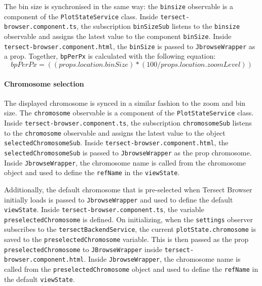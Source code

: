 \documentclass[12pt]{article}
\begin{document}
\begin{itemize}
The bin size is synchronised in the same way: the \verb +binsize+ observable is a component of the \verb +PlotStateService+ class. Inside \verb +tersect-browser.component.ts+, the subscription \verb +binSizeSub+ listens to the \verb +binsize+ observable and assigns the latest value to the component \verb +binSize+. Inside \verb +tersect-browser.component.html+, the \verb +binSize+ is passed to \verb +JbrowseWrapper+ as a prop. 
Together, \verb +bpPerPx+ is calculated with the following equation: \begin{equation} bpPerPx = ((props.location.binSize) * (100 /props.location.zoomLevel)) \end{equation}


\paragraph{Chromosome selection}
The displayed chromosome is synced in a similar fashion to the zoom and bin size. The \verb +chromosome+ observable is a component of the \verb +PlotStateService+ class. Inside \verb +tersect-browser.component.ts+, the subscription \verb +chromosomeSub+ listens to the \verb +chromosome+ observable and assigns the latest value to the object \verb +selectedChromosomeSub+. Inside \verb +tersect-browser.component.html+, the \verb +selectedChromosomeSub+ is passed to \verb +JbrowseWrapper+ as the prop chromosome. Inside \verb +JbrowseWrapper+, the chromosome name is called from the chromosome object and used to define the \verb +refName+ in the \verb +viewState+. 

Additionally, the default chromosome that is pre-selected when Tersect Browser initially loads is passed to \verb +JbrowseWrapper+ and used to define the default \verb +viewState+. Inside \verb +tersect-browser.component.ts+, the variable \verb +preselectedChromosome+ is defined. On initializing, when the \verb +settings+ observer subscribes to the \verb +tersectBackendService+, the current \verb +plotState.chromosome+ is saved to the \verb +preselectedChromosome+ variable. This is then passed as the prop \verb +preselectedChromosome+ to \verb +JBrowseWrapper+ inside \verb +tersect-browser.component.html+.  Inside \verb +JbrowseWrapper+, the chromosome name is called from the \verb +preselectedChromosome+ object and used to define the \verb +refName+ in the default \verb +viewState+. 



\end{itemize}
\end{document}
